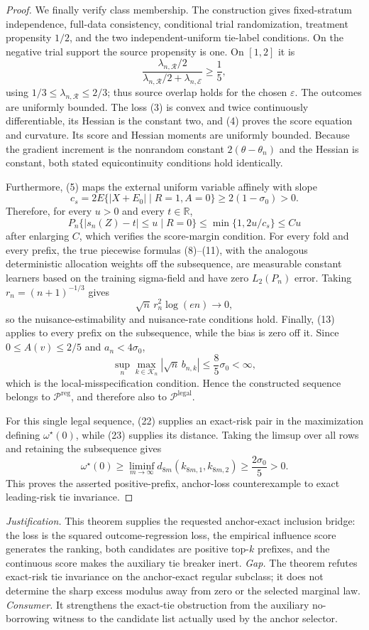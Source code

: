 \documentclass{article}
\begin{document}
\begin{proof}
We finally verify class membership.  The construction gives fixed-stratum independence, full-data consistency, conditional trial randomization, treatment propensity \(1/2\), and the two independent-uniform tie-label conditions.  On the negative trial support the source propensity is one.  On \([1,2]\) it is
\[
 \frac{\lambda_{n,\mathcal R}/2}
 {\lambda_{n,\mathcal R}/2+\lambda_{n,\mathcal E}}
 \geq\frac15,
\]
using \(1/3\leq\lambda_{n,\mathcal R}\leq2/3\); thus source overlap holds for the chosen \(\varepsilon\).  The outcomes are uniformly bounded.  The loss (3) is convex and twice continuously differentiable, its Hessian is the constant two, and (4) proves the score equation and curvature.  Its score and Hessian moments are uniformly bounded.  Because the gradient increment is the nonrandom constant \(2(\theta-\theta_n)\) and the Hessian is constant, both stated equicontinuity conditions hold identically.

Furthermore, (5) maps the external uniform variable affinely with slope
\[
 c_s=2E\{|X+E_0|\mid R=1,A=0\}\geq2(1-\sigma_0)>0.
\]
Therefore, for every \(u>0\) and every \(t\in\mathbb R\),
\[
 P_n\{|s_n(Z)-t|\leq u\mid R=0\}
 \leq \min\{1,2u/c_s\}
 \leq C u
\]
after enlarging \(C\), which verifies the score-margin condition.  For every fold and every prefix, the true piecewise formulas (8)--(11), with the analogous deterministic allocation weights off the subsequence, are measurable constant learners based on the training sigma-field and have zero \(L_2(P_n)\) error.  Taking \(r_n=(n+1)^{-1/3}\) gives
\[
 \sqrt n\,r_n^2\log(en)\longrightarrow0,
\]
so the nuisance-estimability and nuisance-rate conditions hold.  Finally, (13) applies to every prefix on the subsequence, while the bias is zero off it.  Since \(0\leq A(v)\leq2/5\) and \(a_n<4\sigma_0\),
\[
 \sup_n\max_{k\in\mathcal K_n}|\sqrt n\,b_{n,k}|
 \leq\frac85\sigma_0<\infty,
\]
which is the local-misspecification condition.  Hence the constructed sequence belongs to \(\mathcal P^{\mathrm{reg}}\), and therefore also to \(\mathcal P^{\mathrm{legal}}\).

For this single legal sequence, (22) supplies an exact-risk pair in the maximization defining \(\omega^{\star}(0)\), while (23) supplies its distance.  Taking the limsup over all rows and retaining the subsequence gives
\[
 \omega^{\star}(0)
 \geq\liminf_{m\to\infty}
 d_{8m}(k_{8m,1},k_{8m,2})
 \geq\frac{2\sigma_0}{5}>0.
\]
This proves the asserted positive-prefix, anchor-loss counterexample to exact leading-risk tie invariance.
\end{proof}
\par\smallskip\noindent \textit{Justification.} This theorem supplies the requested anchor-exact inclusion bridge: the loss is the squared outcome-regression loss, the empirical influence score generates the ranking, both candidates are positive top-\(k\) prefixes, and the continuous score makes the auxiliary tie breaker inert. \textit{Gap.} The theorem refutes exact-risk tie invariance on the anchor-exact regular subclass; it does not determine the sharp excess modulus away from zero or the selected marginal law. \textit{Consumer.} It strengthens the exact-tie obstruction from the auxiliary no-borrowing witness to the candidate list actually used by the anchor selector.
\end{document}
